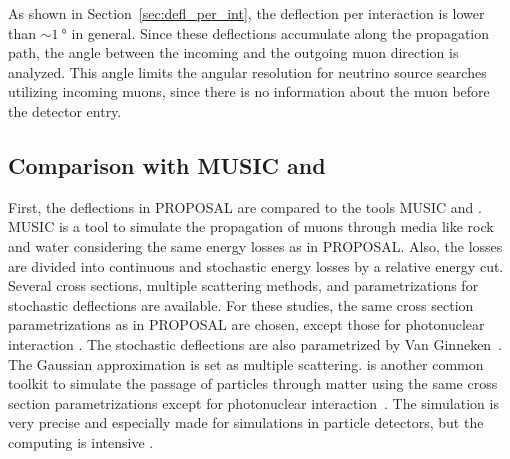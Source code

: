 As shown in Section~\ref{sec:defl_per_int}, the deflection per interaction 
is lower than $\sim\SI{1}{\degree}$ in general. Since these deflections accumulate along the 
propagation path, the angle between the incoming and the outgoing 
muon direction is analyzed. This angle limits the angular resolution 
for neutrino source searches utilizing incoming muons, since there is no information 
about the muon before the detector entry.

\subsection{Comparison with MUSIC and }
First, the deflections in PROPOSAL are compared to 
the tools MUSIC \cite{MUSIC,comparison_MUSIC_GEANT4_2009} and  \cite{GEANT4}.
MUSIC is a tool to simulate the propagation of muons 
through media like rock and water considering the same energy losses as in 
PROPOSAL. Also, the losses are divided into continuous and stochastic 
energy losses by a relative energy cut. Several cross sections, multiple scattering 
methods, and parametrizations for stochastic deflections are 
available. For these studies, the same cross section parametrizations 
as in PROPOSAL are chosen, except those for 
photonuclear interaction \cite{nulcint_bugaev_Shlepin, bugaev_1980_defl,bugaev_1981_defl}. The stochastic deflections are also parametrized by 
Van Ginneken~\cite{Van_Ginneken}. 
The Gaussian 
approximation \cite{HIGHLAND_1975} is set as multiple scattering. 
 is another common toolkit to simulate the passage of particles through 
matter using the same cross section parametrizations except for photonuclear interaction~\cite{Borog:1975_inelastic}. The simulation is very precise and especially 
made for simulations in particle detectors, but the computing is 
intensive \cite{GEANT4}. 

